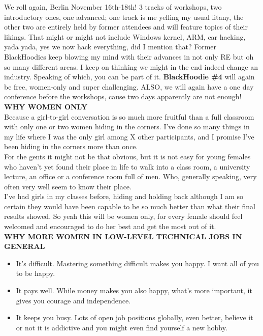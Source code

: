 We roll again, Berlin November 16th-18th! 3 tracks of workshops, two introductory ones, one  advanced; one track is me yelling my usual litany, the other two are entirely held by former attendees and will feature topics of their likings. That might or might not include Windows kernel, ARM, car hacking, yada yada, yes we now hack everything, did I mention that? Former BlackHoodies keep blowing my mind with their advances in not only RE but oh so many different areas. I keep on thinking we might in the end indeed change an industry. Speaking of which, you can be part of it. \textbf{BlackHoodie \#4} will again be free, women-only and super challenging. ALSO, we will again have a one day conference before the workshops, cause two days apparently are not enough!\\

\textbf{WHY WOMEN ONLY} \\

Because a girl-to-girl conversation is so much more fruitful than a full classroom with only one or two women hiding in the corners. I’ve done so many things in my life where I was the only girl among X other participants, and I promise I’ve been hiding in the corners more than once.\\

For the gents it might not be that obvious, but it is not easy for young females who haven’t yet found their place in life to walk into a class room, a university lecture, an office or a conference room full of men. Who, generally speaking, very often very well seem to know their place.\\

I’ve had girls in my classes before, hiding and holding back although I am so certain they would have been capable to be so much better than what their final results showed. So yeah this will be women only, for every female should feel welcomed and encouraged to do her best and get the most out of it.\\

\textbf{WHY MORE WOMEN IN LOW-LEVEL TECHNICAL JOBS IN GENERAL}

\begin{itemize}
	\item It’s difficult. Mastering something difficult makes you happy. I want all of you to be happy.
	\item It pays well. While money makes you also happy, what’s more important, it gives you courage and independence.
	\item It keeps you busy. Lots of open job positions globally, even better, believe it or not it is addictive and you might even find yourself a new hobby.
\end{itemize}


